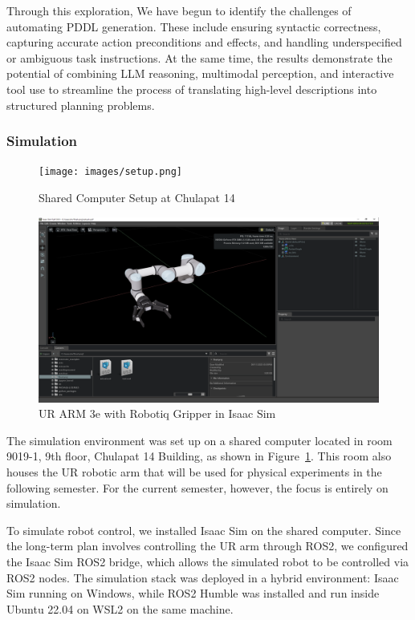 \documentclass[12pt]{extarticle}
\begin{document}
Through this exploration, We have begun to identify the challenges of automating PDDL generation. These include ensuring syntactic correctness, capturing accurate action preconditions and effects, and handling underspecified or ambiguous task instructions. At the same time, the results demonstrate the potential of combining LLM reasoning, multimodal perception, and interactive tool use to streamline the process of translating high-level descriptions into structured planning problems.

\subsubsection{Simulation}

\begin{figure}[h]
    \centering
    \texttt{[image: images/setup.png]}
    \caption{Shared Computer Setup at Chulapat 14}
    \label{fig: setup}
\end{figure}

\begin{figure}[htbp]
    \centering
    \includegraphics[width=\linewidth]{images/isaac_ur.png}
    \caption{UR ARM 3e with Robotiq Gripper in Isaac Sim}
    \label{fig: isaac-sim-ur}
\end{figure}

The simulation environment was set up on a shared computer located in room 9019-1, 9th floor, Chulapat 14 Building, as shown in Figure~\ref{fig: setup}. This room also houses the UR robotic arm that will be used for physical experiments in the following semester. For the current semester, however, the focus is entirely on simulation.

To simulate robot control, we installed Isaac Sim on the shared computer. Since the long-term plan involves controlling the UR arm through ROS2, we configured the Isaac Sim ROS2 bridge, which allows the simulated robot to be controlled via ROS2 nodes. The simulation stack was deployed in a hybrid environment: Isaac Sim running on Windows, while ROS2 Humble was installed and run inside Ubuntu 22.04 on WSL2 on the same machine.
\end{document}
